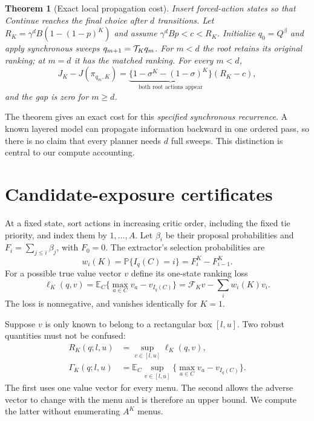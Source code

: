 \documentclass[11pt]{article}
\newtheorem{theorem}{Theorem}
\newcommand{\E}{\mathbb E}\newcommand{\Prb}{\mathbb P}\newcommand{\R}{\mathbb R}
\newcommand{\cF}{\mathcal F}\newcommand{\cC}{\mathcal C}
\begin{document}
\begin{theorem}[Exact local propagation cost]\label{thm:delay}
Insert forced-action states so that Continue reaches the final choice after $d$ transitions. Let $R_K=\gamma^dB(1-(1-p)^K)$ and assume $\gamma^dBp<c<R_K$. Initialize $q_0=Q^\beta$ and apply synchronous sweeps $q_{m+1}=\mathcal T_Kq_m$. For $m<d$ the root retains its original ranking; at $m=d$ it has the matched ranking. For every $m<d$,
\begin{equation}
 J_K-J(\pi_{q_m,K})=
 \underbrace{\{1-\sigma^K-(1-\sigma)^K\}}_{\text{both root actions appear}}(R_K-c),
 \label{eq:delay}
\end{equation}
and the gap is zero for $m\ge d$.
\end{theorem}
The theorem gives an exact cost for this \emph{specified synchronous recurrence}. A known layered model can propagate information backward in one ordered pass, so there is no claim that every planner needs $d$ full sweeps. This distinction is central to our compute accounting.

\section{Candidate-exposure certificates}
At a fixed state, sort actions in increasing critic order, including the fixed tie priority, and index them by $1,\ldots,A$. Let $\beta_i$ be their proposal probabilities and $F_i=\sum_{j\le i}\beta_j$, with $F_0=0$. The extractor's selection probabilities are
\begin{equation}
 w_i(K)=\Prb\{I_q(C)=i\}=F_i^K-F_{i-1}^K.
 \label{eq:weights}
\end{equation}
For a possible true value vector $v$ define its one-state ranking loss
\begin{equation}
 \ell_K(q,v)=\E_C\{\max_{a\in C}v_a-v_{I_q(C)}\}
 =\cF_Kv-\sum_iw_i(K)v_i.
 \label{eq:local-loss}
\end{equation}
The loss is nonnegative, and vanishes identically for $K=1$.

Suppose $v$ is only known to belong to a rectangular box $[l,u]$. Two robust quantities must not be confused:
\begin{align}
 R_K(q;l,u)&=\sup_{v\in[l,u]}\ell_K(q,v),\label{eq:robust}\\
 \Gamma_K(q;l,u)&=\E_C\sup_{v\in[l,u]}
 \{\max_{a\in C}v_a-v_{I_q(C)}\}.\label{eq:envelope}
\end{align}
The first uses one value vector for every menu. The second allows the adverse vector to change with the menu and is therefore an upper bound. We compute the latter without enumerating $A^K$ menus.
\end{document}
